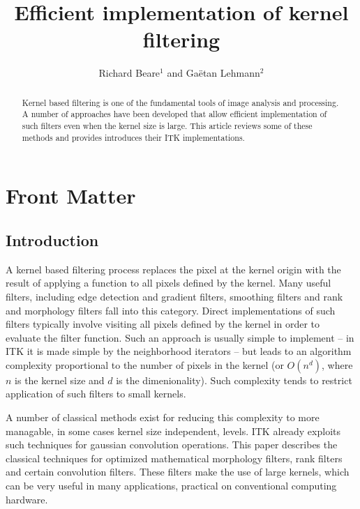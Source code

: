 \documentclass{InsightArticle}
\title{Efficient implementation of kernel filtering}
\author{Richard Beare{$^1$} {\small{and}} Ga\"etan Lehmann{$^2$}}
\begin{document}
\maketitle

\ifhtml
\chapter*{Front Matter\label{front}}
\fi


\begin{abstract}
\noindent
Kernel based filtering is one of the fundamental tools of image
analysis and processing. A number of approaches have been developed
that allow efficient implementation of such filters even when the
kernel size is large. This article reviews some of these methods and
provides introduces their ITK implementations.
\end{abstract}

\tableofcontents

\section{Introduction}
A kernel based filtering process replaces the pixel at the kernel
origin with the result of applying a function to all pixels defined by
the kernel. Many useful filters, including edge detection and gradient
filters, smoothing filters and rank and morphology filters fall into
this category. Direct implementations of such filters typically
involve visiting all pixels defined by the kernel in order to evaluate
the filter function. Such an approach is usually simple to implement
-- in ITK it is made simple by the neighborhood iterators -- but leads
to an algorithm complexity proportional to the number of pixels in the
kernel (or $O(n^d)$, where $n$ is the kernel size and $d$ is the
dimenionality). Such complexity tends to restrict application of such
filters to small kernels.

A number of classical methods exist for reducing this complexity to
more managable, in some cases kernel size independent, levels. ITK
already exploits such techniques for gaussian convolution
operations. This paper describes the classical techniques for
optimized mathematical morphology filters, rank filters and certain
convolution filters. These filters make the use of large kernels,
which can be very useful in many applications, practical on
conventional computing hardware.
\end{document}
